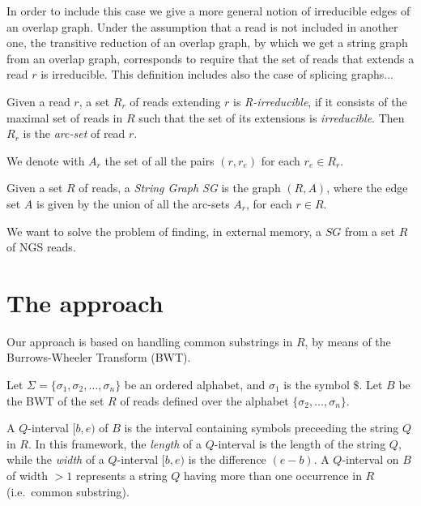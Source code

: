 \documentclass[11pt]{article}
\newcommand{\ie}{i.e.~}
\begin{document}
In order to include this case we give a more general notion of irreducible edges of an overlap graph. Under the assumption that a read is not included in another one, the transitive reduction of an overlap graph, by which we get a string graph from an overlap graph, corresponds to require that the set of reads that extends a read $r$ is irreducible. This definition includes also the case of  splicing graphs...


Given a read $r$, a set $R_r$ of reads extending $r$ is \emph{R-irreducible}, if it consists of the maximal set of reads in $R$ such that the set of its extensions  is \emph{irreducible}.
Then $R_r$ is the {\em arc-set} of  read $r$.

We denote with $A_r$ the set of all the pairs $(r, r_e)$ for each $r_e \in R_r$.

\begin{definition}
Given a set $R$ of reads, a \emph{String Graph SG} is the graph $(R, A)$, where the edge set $A$ is given by the union of all the arc-sets $A_r$, for each $r \in R$.
\end{definition}

We want to solve the problem of finding, in external memory, a $SG$ from a set $R$ of NGS reads.




\section*{The approach}

%

Our approach is based on handling common substrings in $R$, by means of the Burrows-Wheeler Transform (BWT).

Let $\Sigma=\{\sigma_1, \sigma_2, \ldots, \sigma_n\}$ be an ordered alphabet, and $\sigma_1$ is the symbol $\$$. Let $B$ be the BWT of the set $R$ of reads defined over the alphabet $\{\sigma_2, \ldots, \sigma_n\}$.

A $Q$-interval $[b,e)$ of $B$ is the interval containing symbols preceeding the string $Q$ in $R$. In this framework, the \emph{length} of a $Q$-interval is the length of the string $Q$, while the \emph{width} of a $Q$-interval $[b, e)$ is the difference $(e-b)$. A $Q$-interval on $B$ of width $>1$ represents a string $Q$ having more than one occurrence in $R$ (\ie common substring). 
\end{document}
